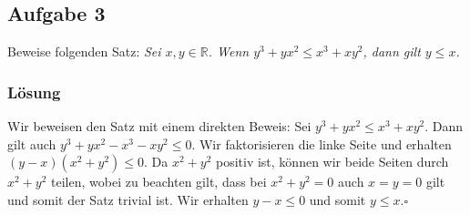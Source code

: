 \documentclass[a4paper,10pt]{article}
\newcommand{\R}{\mathbb{R}}
\newcommand{\s}[1]{#1}
\begin{document}
\subsection*{Aufgabe 3}
Beweise folgenden Satz:
\textit{Sei $x,y\in \R$. Wenn $y^3+yx^2 \leq x^3+xy^2$, dann gilt $y\leq x$.}
\s{\subsubsection*{Lösung}
Wir beweisen den Satz mit einem direkten Beweis: Sei $y^3+yx^2\leq x^3+xy^2$. Dann gilt auch $y^3+yx^2- x^3-xy^2\leq 0$. Wir faktorisieren die linke Seite und erhalten $(y-x)(x^2+y^2)\leq 0$. Da $x^2+y^2$ positiv ist, können wir beide Seiten durch $x^2+y^2$ teilen, wobei zu beachten gilt, dass bei $x^2+y^2=0$ auch $x=y=0$ gilt und somit der Satz trivial ist. Wir erhalten $y-x\leq 0$ und somit $y\leq x$.\hfill$\square$
}
\end{document}
